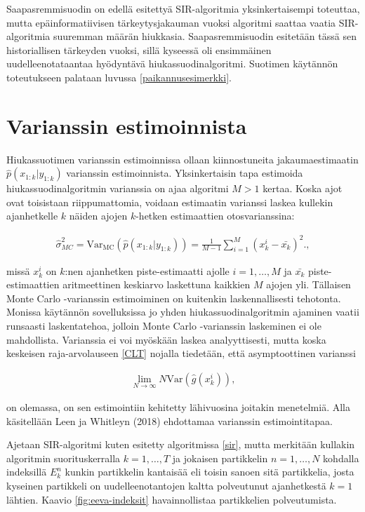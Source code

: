 \documentclass[
  12pt,
  a4paper, twoside]{book}
\begin{document}
Saapasremmisuodin on edellä esitettyä SIR-algoritmia yksinkertaisempi toteuttaa, mutta epäinformatiivisen tärkeytysjakauman vuoksi algoritmi saattaa vaatia SIR-algoritmia suuremman määrän hiukkasia. Saapasremmisuodin esitetään tässä sen historiallisen tärkeyden vuoksi, sillä kyseessä oli ensimmäinen uudelleenotataantaa hyödyntävä hiukassuodinalgoritmi. Suotimen käytännön toteutukseen palataan luvussa \ref{paikannusesimerkki}.

\section{Varianssin estimoinnista} \label{varianssin-estimointi}

Hiukassuotimen varianssin estimoinnissa ollaan kiinnostuneita jakaumaestimaatin \(\hat{p}(x_{1:k}|y_{1:k})\) varianssin estimoinnista. Yksinkertaisin tapa estimoida hiukassuodinalgoritmin varianssia on ajaa algoritmi \(M > 1\) kertaa. Koska ajot ovat toisistaan riippumattomia, voidaan estimaatin varianssi laskea kullekin ajanhetkelle \(k\) näiden ajojen \(k\)-hetken estimaattien otosvarianssina:

\begin{align}\label{MC-varianssi}
\hat{\sigma}^2_{MC} = \text{Var}_{\text{MC}}(\hat{p}(x_{1:k}|y_{1:k})) = \frac{1}{M-1} \sum_{i=1}^{M}(x_k^i-\bar{x_k})^2.
,\end{align}

missä \(x_k^i\) on \(k\):nen ajanhetken piste-estimaatti ajolle \(i=1,\ldots,M\) ja \(\bar{x_k}\) piste-estimaattien aritmeettinen keskiarvo laskettuna kaikkien \(M\) ajojen yli. Tällaisen Monte Carlo -varianssin estimoiminen on kuitenkin laskennallisesti tehotonta. Monissa käytännön sovelluksissa jo yhden hiukassuodinalgoritmin ajaminen vaatii runsaasti laskentatehoa, jolloin Monte Carlo -varianssin laskeminen ei ole mahdollista. Varianssia ei voi myöskään laskea analyyttisesti, mutta koska keskeisen raja-arvolauseen \ref{CLT} nojalla tiedetään, että asymptoottinen varianssi

\begin{align}\label{asymptoottinen-varianssi}
\lim_{N\to \infty} N \text {Var}(\hat{g}(x_k^i))
,\end{align}

on olemassa, on sen estimointiin kehitetty lähivuosina joitakin menetelmiä. Alla käsitellään Leen ja Whitleyn (2018) ehdottamaa varianssin estimointitapaa. \citep{Lee-2018}

Ajetaan SIR-algoritmi kuten esitetty algoritmissa \ref{sir}, mutta merkitään kullakin algoritmin suorituskerralla \(k=1,\ldots,T\) ja jokaisen partikkelin \(n=1,\ldots,N\) kohdalla indeksillä \(E_k^n\) kunkin partikkelin kantaisää eli toisin sanoen sitä partikkelia, josta kyseinen partikkeli on uudelleenotantojen kaltta polveutunut ajanhetkestä \(k=1\) lähtien. Kaavio \ref{fig:eeva-indeksit} havainnollistaa partikkelien polveutumista.
\end{document}
